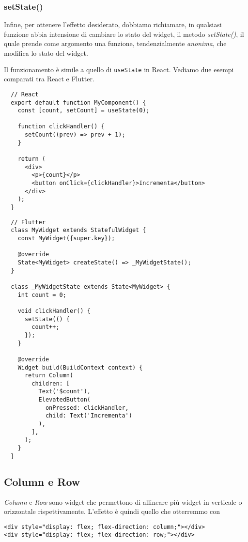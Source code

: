 \documentclass[12pt]{article}
\begin{document}
\subsubsection{setState()}
Infine, per ottenere l'effetto desiderato, dobbiamo richiamare,
in qualsiasi funzione abbia intensione di cambiare lo stato del widget,
il metodo \textit{setState()}, il quale prende come argomento una 
funzione, tendenzialmente \textit{anonima}, che modifica lo stato del widget.

Il funzionamento è simile a quello di \texttt{useState} in React.
Vediamo due esempi comparati tra React e Flutter.

\begin{highlight}
\begin{verbatim}
  // React
  export default function MyComponent() {
    const [count, setCount] = useState(0);
  
    function clickHandler() {
      setCount((prev) => prev + 1);
    }
  
    return (
      <div>
        <p>{count}</p>
        <button onClick={clickHandler}>Incrementa</button>
      </div>
    );
  }
\end{verbatim}
\end{highlight}

\begin{highlight}
\begin{verbatim}
  // Flutter
  class MyWidget extends StatefulWidget {
    const MyWidget({super.key});
  
    @override
    State<MyWidget> createState() => _MyWidgetState();
  }
  
  class _MyWidgetState extends State<MyWidget> {
    int count = 0;
  
    void clickHandler() {
      setState(() {
        count++;
      });
    }
  
    @override
    Widget build(BuildContext context) {
      return Column(
        children: [
          Text('$count'),
          ElevatedButton(
            onPressed: clickHandler, 
            child: Text('Incrementa')
          ),
        ],
      );
    }
  }
\end{verbatim}
\end{highlight}










\subsection{Column e Row}
\textit{Column} e \textit{Row} sono widget che permettono di allineare
più widget in verticale o orizzontale rispettivamente.
L'effetto è quindi quello che otterremmo con 
\begin{verbatim}
<div style="display: flex; flex-direction: column;"></div>
<div style="display: flex; flex-direction: row;"></div>
\end{verbatim}
\end{document}
